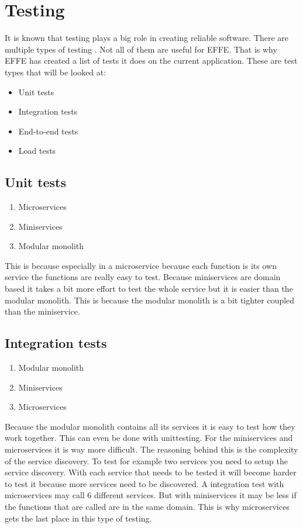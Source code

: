 \section{Testing}
\label{sec:Testing}

It is known that testing plays a big role in creating reliable software. There are multiple types of testing \cite{testTypes}. Not all of them are useful for EFFE. That is why EFFE has created a list of tests it does on the current application. These are test types that will be looked at:

\begin{itemize}
        \item Unit tests
        \item Integration tests
        \item End-to-end tests
        \item Load tests
\end{itemize}

\subsection{Unit tests}
\label{sec:UnitTests}

\begin{enumerate}
        \item Microservices
        \item Miniservices
        \item Modular monolith
\end{enumerate}

This is because especially in a microservice because each function is its own service the functions are really easy to test. Because miniservices are domain based it takes a bit more effort to test the whole service but it is easier than the modular monolith. This is because the modular monolith is a bit tighter coupled than the miniservice.

\subsection{Integration tests}

\begin{enumerate}
        \item Modular monolith
        \item Miniservices
        \item Microservices
\end{enumerate}

Because the modular monolith contains all its services it is easy to test how they work together. This can even be done with unittesting. For the miniservices and microservices it is way more difficult. The reasoning behind this is the complexity of the service discovery. To test for example two services you need to setup the service discovery. With each service that needs to be tested it will become harder to test it because more services need to be discovered. A integration test with microservices may call 6 different services. But with miniservices it may be less if the functions that are called are in the same domain. This is why microservices gets the last place in this type of testing.

